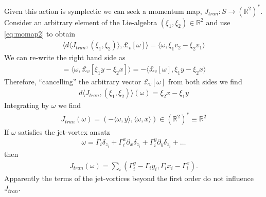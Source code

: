 \documentclass[12pt]{amsart}
\begin{document}
Given this action is symplectic we can seek a momentum map, $J_{tran}:S \to (\mathbb{R}^2)^*$.  Consider an arbitrary element of the Lie-algebra $(\xi_1,\xi_2) \in \mathbb{R}^2$ and use \eqref{eq:momap2} to obtain
\begin{align*}
  \langle d \langle J_{tran} , (\xi_1,\xi_2) \rangle , \pounds_v[\omega] \rangle
  = \langle \omega , \xi_1 v_2 - \xi_2 v_1 \rangle
\end{align*}
We can re-write the right hand side as
\begin{align*}
  = \langle \omega , \pounds_v[ \xi_1 y - \xi_2 x] \rangle 
  = - \langle \pounds_v[\omega] , \xi_1 y - \xi_2 x \rangle
\end{align*}
Therefore, ``cancelling'' the arbitrary vector $\pounds_v[\omega]$ from both sides we find
\begin{align*}
  d \langle J_{tran} , (\xi_1,\xi_2) \rangle(\omega) = \xi_2 x - \xi_1 y
\end{align*}
Integrating by $\omega$ we find
\begin{align*}
  \boxed{
    J_{tran}(\omega) = ( -\langle \omega ,y \rangle , \langle \omega , x \rangle ) \in (\mathbb{R}^2)^* \equiv \mathbb{R}^2}
\end{align*}
If $\omega$ satisfies the jet-vortex ansatz
\begin{align*}
  \omega = \Gamma_i \delta_{z_i} + \Gamma_i^x \partial_x \delta_{z_i} + \Gamma_i^y \partial_y \delta_{z_i} + \dots
\end{align*}
then
\begin{align*}
  J_{tran}(\omega) = \sum_i ( \Gamma_i^{y} - \Gamma_i y_i , \Gamma_i x_i -\Gamma_i^{x} ).
\end{align*}
Apparently the terms of the jet-vortices beyond the first order do not influence $J_{tran}$.
\end{document}
